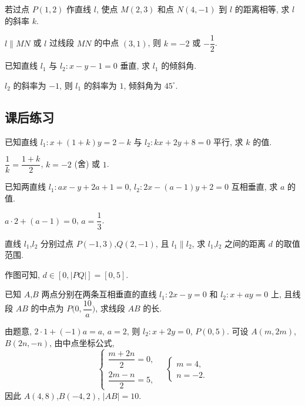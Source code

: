 \begin{exercise}
    若过点 $P(1, 2)$ 作直线 $l$, 使点 $M(2,3)$ 和点 $N(4,-1)$ 到 $l$ 的距离相等, 求 $l$ 的斜率 $k$.
\end{exercise}
\beginsolution
    $l\parallel MN$ 或 $l$ 过线段 $MN$ 的中点 $(3,1)$, 则 $k=-2$ 或 $-\dfrac12$.
\endsolution

\begin{exercise}
    已知直线 $l_1$ 与 $l_2\colon x-y-1=0$ 垂直, 求 $l_1$ 的倾斜角.
\end{exercise}
\beginsolution
    $l_2$ 的斜率为 $-1$, 则 $l_1$ 的斜率为 $1$, 倾斜角为 $45^\circ$.
\endsolution

\subsection{课后练习}
\begin{exercise}
    已知直线 $l_1 \colon x+(1+k)y=2-k$ 与 $l_2 \colon kx+2y+8=0$ 平行, 求 $k$ 的值.
\end{exercise}
\beginsolution
    $\dfrac1k= \dfrac{1+k}2$, $k=-2$ (舍) 或 $1$.
\endsolution

\begin{exercise}
    已知两直线 $l_1 \colon ax-y+2a+1=0$, $l_2 \colon 2x-(a-1)y+2=0$ 互相垂直, 求 $a$ 的值.
\end{exercise}
\beginsolution
    $a\cdot 2+(a-1)= 0$, $a=\dfrac13$.
\endsolution

\begin{exercise}
    直线 $l_1$,$l_2$ 分别过点 $P(-1,3)$,$Q(2,-1)$, 且 $l_1\parallel l_2$, 求 $l_1$,$l_2$ 之间的距离 $d$ 的取值范围.
\end{exercise}
\beginsolution
    作图可知, $d\in[0,|PQ|]= [0,5]$.
\endsolution

\begin{exercise}
    已知 $A$,$B$ 两点分别在两条互相垂直的直线 $l_1\colon 2x-y=0$ 和 $l_2\colon x+ay=0$ 上, 且线段 $AB$ 的中点为 $P\Big(0,\dfrac{10}a\Big)$, 求线段 $AB$ 的长.
\end{exercise}
\beginsolution
    由题意, $2\cdot 1+ (-1)a= a$, $a=2$, 则 $l_2\colon x+2y=0$, $P(0,5)$. 可设 $A(m,2m)$, $B(2n,-n)$, 由中点坐标公式,
    \[\left\{\!\!\begin{array}{l}
        \dfrac{m+2n}2= 0,\\
        \dfrac{2m-n}2= 5,
    \end{array}\right.\quad
    \left\{\!\!\begin{array}{l}
        m=4,\\
        n=-2.
    \end{array}\right.\]
    因此 $A(4,8)$,$B(-4,2)$, $|AB|= 10$.
\endsolution


